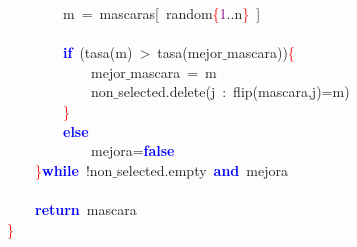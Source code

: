 \mbox{}\ \ \ \ \ \ \ \ m\ \textcolor{BrickRed}{=}\ mascaras\textcolor{BrickRed}{[}\ random\textcolor{Red}{\{}\textcolor{Purple}{1}\textcolor{BrickRed}{..}n\textcolor{Red}{\}}\ \textcolor{BrickRed}{]} \\
\mbox{} \\
\mbox{}\ \ \ \ \ \ \ \ \textbf{\textcolor{Blue}{if}}\ \textcolor{BrickRed}{(}tasa\textcolor{BrickRed}{(}m\textcolor{BrickRed}{)}\ \textcolor{BrickRed}{\textgreater{}}\ tasa\textcolor{BrickRed}{(}mejor$\_$mascara\textcolor{BrickRed}{))}\textcolor{Red}{\{} \\
\mbox{}\ \ \ \ \ \ \ \ \ \ \ \ mejor$\_$mascara\ \textcolor{BrickRed}{=}\ m \\
\mbox{}\ \ \ \ \ \ \ \ \ \ \ \ non$\_$selected\textcolor{BrickRed}{.}delete\textcolor{BrickRed}{(}j\ \textcolor{BrickRed}{:}\ flip\textcolor{BrickRed}{(}mascara\textcolor{BrickRed}{,}j\textcolor{BrickRed}{)=}m\textcolor{BrickRed}{)} \\
\mbox{}\ \ \ \ \ \ \ \ \textcolor{Red}{\}} \\
\mbox{}\ \ \ \ \ \ \ \ \textbf{\textcolor{Blue}{else}} \\
\mbox{}\ \ \ \ \ \ \ \ \ \ \ \ mejora\textcolor{BrickRed}{=}\textbf{\textcolor{Blue}{false}} \\
\mbox{}\ \ \ \ \textcolor{Red}{\}}\textbf{\textcolor{Blue}{while}}\ \textcolor{BrickRed}{!}non$\_$selected\textcolor{BrickRed}{.}empty\ \textbf{\textcolor{Blue}{and}}\ mejora \\
\mbox{} \\
\mbox{}\ \ \ \ \textbf{\textcolor{Blue}{return}}\ mascara \\
\mbox{}\textcolor{Red}{\}} \\
\mbox{}
